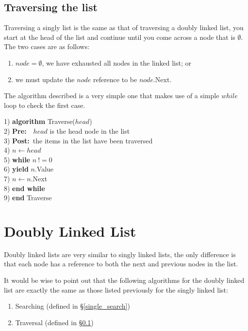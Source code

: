\subsection{Traversing the list} \label{singly_linked_traversal}
Traversing a singly list is the same as that of traversing a doubly linked list, you start at the head of the list and continue until you come across a node that is $\emptyset$. The two cases are as follows:
\begin{enumerate}
\item $node = \emptyset$, we have exhausted all nodes in the linked list; or
\item we must update the $node$ reference to be $node$.Next.
\end{enumerate}

The algorithm described is a very simple one that makes use of a simple $while$ loop to check the first case.

\begin{tabbing}
1)  \textbf{alg}\= \textbf{orithm} Traverse($head$) \\
2)  \> \textbf{Pre:}~~$head$ is the head node in the list \\
3)  \> \textbf{Post:}~the items in the list have been traversed \\
4)  \> $n \leftarrow head$ \\
5)  \> \textbf{whi}\=\textbf{le} $n~!= 0$ \\
6)  \> \> \textbf{yield} $n$.Value \\
7)  \> \> $n \leftarrow n$.Next \\
8)  \> \textbf{end while} \\
9)  \textbf{end} Traverse \\
\end{tabbing}

\section{Doubly Linked List}
Doubly linked lists are very similar to singly linked lists, the only difference is that each node has a reference to both the next and previous nodes in the list.

It would be wise to point out that the following algorithms for the doubly linked list are exactly the same as those listed previously for the singly linked list:

\begin{enumerate}
\item Searching (defined in \S\ref{single_search})
\item Traversal (defined in \S\ref{singly_linked_traversal})
\end{enumerate}

